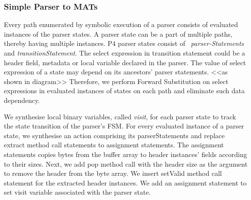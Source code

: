 \documentclass{hotnets19}
\begin{document}
\subsubsection{Simple Parser to MATs}
\label{subsubsection:simple-parser-to-mats}
Every path enumerated by symbolic execution of a parser consists of evaluated instances of the parser states.
A parser state can be a part of multiple paths, thereby having multiple instances.
P4 parser states consist of ~\emph{parser-Statements}  and \emph{transition\-Statement}.
The select expression in transition statement could be a header field, metadata or local variable declared in the parser.
The value of select expression of a state may depend on its ancestors' parser statements. <<as shown in diagram>>
Therefore, we perform Forward Substitution on select expressions in evaluated instances of states
on each path and eliminate such data dependency.

We synthesise local binary variables, called \emph{visit},  for each parser state to track the state transition of the parser's FSM.
For every evaluated instance of a parser state, we synthesise an action comprising its parser\-Statements and replace extract method call statements to assignment statements.
The assignment statements copies bytes from the buffer array to header instances' fields according to their sizes.
Next, we add pop method call with the header size as the argument to remove the header from the byte array.
We insert setValid method call statement for the extracted header instances.
We add an assignment statement to set visit variable associated with the parser state.
\end{document}
